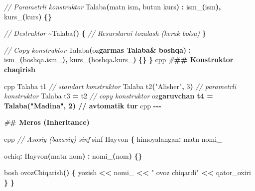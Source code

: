 \documentclass[a4paper,11pt,twoside,openright]{book}
\newenvironment{Shaded}{\begin{snugshade}}{\end{snugshade}}
\newcommand{\CharTok}[1]{\textcolor[rgb]{0.31,0.60,0.02}{#1}}
\newcommand{\CommentTok}[1]{\textcolor[rgb]{0.56,0.35,0.01}{\textit{#1}}}
\newcommand{\DecValTok}[1]{\textcolor[rgb]{0.00,0.00,0.81}{#1}}
\newcommand{\ErrorTok}[1]{\textcolor[rgb]{0.64,0.00,0.00}{\textbf{#1}}}
\newcommand{\NormalTok}[1]{#1}
\newcommand{\OperatorTok}[1]{\textcolor[rgb]{0.81,0.36,0.00}{\textbf{#1}}}
\newcommand{\PreprocessorTok}[1]{\textcolor[rgb]{0.56,0.35,0.01}{\textit{#1}}}
\newcommand{\StringTok}[1]{\textcolor[rgb]{0.31,0.60,0.02}{#1}}
\newcommand{\VariableTok}[1]{\textcolor[rgb]{0.00,0.00,0.00}{#1}}
\begin{document}
\begin{Shaded}
\begin{Highlighting}[]
    \CommentTok{// Parametrli konstruktor}
\NormalTok{    Talaba}\OperatorTok{(}\NormalTok{matn ism}\OperatorTok{,}\NormalTok{ butun kurs}\OperatorTok{)} \OperatorTok{:} \VariableTok{ism\_}\OperatorTok{(}\NormalTok{ism}\OperatorTok{),} \VariableTok{kurs\_}\OperatorTok{(}\NormalTok{kurs}\OperatorTok{)} \OperatorTok{\{\}}

    \CommentTok{// Destruktor}
    \OperatorTok{\textasciitilde{}}\NormalTok{Talaba}\OperatorTok{()} \OperatorTok{\{}
        \CommentTok{// Resurslarni tozalash (kerak bo\textquotesingle{}lsa)}
    \OperatorTok{\}}

    \CommentTok{// Copy konstruktor}
\NormalTok{    Talaba}\OperatorTok{(}\NormalTok{o}\CharTok{\textquotesingle{}z}\ErrorTok{garmas Talaba\& boshqa)}
        \OperatorTok{:} \VariableTok{ism\_}\OperatorTok{(}\NormalTok{boshqa}\OperatorTok{.}\VariableTok{ism\_}\OperatorTok{),} \VariableTok{kurs\_}\OperatorTok{(}\NormalTok{boshqa}\OperatorTok{.}\VariableTok{kurs\_}\OperatorTok{)} \OperatorTok{\{\}}
\OperatorTok{\}}
\ErrorTok{\textasciigrave{}\textasciigrave{}\textasciigrave{}}\NormalTok{cpp}
\PreprocessorTok{\#}\ErrorTok{\#\# Konstruktor chaqirish}

\ErrorTok{\textasciigrave{}\textasciigrave{}\textasciigrave{}}\NormalTok{cpp}
\NormalTok{Talaba t1                              }\CommentTok{// standart konstruktor}
\NormalTok{Talaba t2}\OperatorTok{(}\StringTok{"Alisher"}\OperatorTok{,} \DecValTok{3}\OperatorTok{)}               \CommentTok{// parametrli konstruktor}
\NormalTok{Talaba t3 }\OperatorTok{=}\NormalTok{ t2                         }\CommentTok{// copy konstruktor}
\NormalTok{o}\CharTok{\textquotesingle{}z}\ErrorTok{garuvchan t4 = Talaba("Madina", 2) // avtomatik tur}
\ErrorTok{\textasciigrave{}\textasciigrave{}\textasciigrave{}}\NormalTok{cpp}
\OperatorTok{{-}{-}{-}}

\PreprocessorTok{\#}\ErrorTok{\# Meros (Inheritance)}

\ErrorTok{\textasciigrave{}\textasciigrave{}\textasciigrave{}}\NormalTok{cpp}
\CommentTok{// Asosiy (bazaviy) sinf}
\NormalTok{sinf Hayvon }\OperatorTok{\{}
\NormalTok{himoyalangan}\OperatorTok{:}
\NormalTok{    matn }\VariableTok{nomi\_}

\NormalTok{ochiq}\OperatorTok{:}
\NormalTok{    Hayvon}\OperatorTok{(}\NormalTok{matn nom}\OperatorTok{)} \OperatorTok{:} \VariableTok{nomi\_}\OperatorTok{(}\NormalTok{nom}\OperatorTok{)} \OperatorTok{\{\}}

\NormalTok{    bosh ovozChiqarish}\OperatorTok{()} \OperatorTok{\{}
\NormalTok{        yozish }\OperatorTok{\textless{}\textless{}} \VariableTok{nomi\_} \OperatorTok{\textless{}\textless{}} \StringTok{" ovoz chiqardi"} \OperatorTok{\textless{}\textless{}}\NormalTok{ qator\_oxiri}
    \OperatorTok{\}}
\OperatorTok{\}}


\end{Highlighting}
\end{Shaded}
\end{document}
